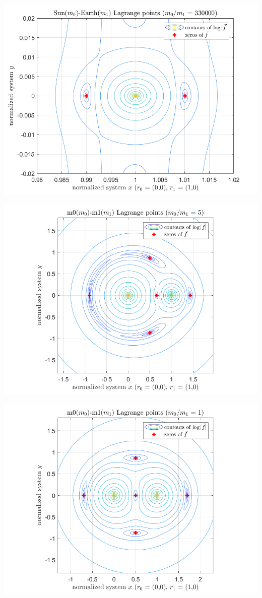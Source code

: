 \documentclass[twoside,11pt]{article}
\begin{document}
\begin{minipage}{\textwidth}
	\begin{center}
		\includegraphics[width=0.8\linewidth]{../Sun-Earth_zoom.png}
		\label{fig:sunearth}
	\end{center}
\end{minipage}

\begin{minipage}{\textwidth}
	\begin{center}
		\includegraphics[width=0.8\linewidth]{../m0-m1_mr5.png}
		\label{fig:sunearth}
	\end{center}
\end{minipage}

\begin{minipage}{\textwidth}
	\begin{center}
		\includegraphics[width=0.8\linewidth]{../m0-m1_mr1.png}
		\label{fig:sunearth}
	\end{center}
\end{minipage}



\end{document}
